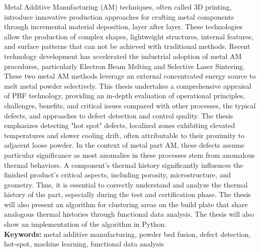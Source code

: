 Metal Additive Manufacturing (AM) techniques, often called 3D printing, introduce innovative production approaches for crafting metal components through incremental material deposition, layer after layer. These technologies allow the production of complex shapes, lightweight structures, internal features, and surface patterns that can not be achieved with traditional methods. Recent technology development has accelerated the industrial adoption of metal AM procedures, particularly  Electron Beam Melting and Selective Laser Sintering. These two metal AM methods leverage an external concentrated energy source to melt metal powder selectively.
This thesis undertakes a comprehensive appraisal of PBF technology, providing an in-depth evaluation of operational principles, challenges, benefits, and critical issues compared with other processes, the typical defects, and approaches to defect detection and control quality. The thesis emphasizes detecting "hot spot" defects, localized zones exhibiting elevated temperatures and slower cooling drift, often attributable to their proximity to adjacent loose powder. In the context of metal part AM, these defects assume particular significance as most anomalies in these processes stem from anomalous thermal behaviors. A component's thermal history significantly influences the finished product's critical aspects, including porosity, microstructure, and geometry. Thus, it is essential to correctly understand and analyze the thermal history of the part, especially during the test and certification phase. The thesis will also present an algorithm for clustering areas on the build plate that share analogous thermal histories through functional data analysis. The thesis will also show an implementation of the algorithm in Python.
\\[0.5cm]
\textbf{Keywords:} metal additive manufacturing, powder bed fusion, defect detection, hot-spot, machine learning, functional data analysis
